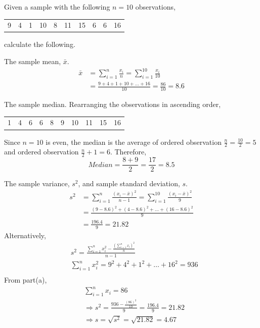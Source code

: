 \begin{example}
Given a sample with the following $n=10$ observations,
\begin{center}
\begin{tabular}{cccccccccc}
9 & 4 & 1 & 10 & 8 & 11 & 15 & 6 & 6 & 16
\end{tabular} 
\end{center}
calculate the following.
\begin{benumerate}
\item The sample mean, $\bar{x}$. 
\begin{align*}
\bar{x} &= \sum_{i=1}^{n} \frac{x_i}{n} = \sum_{i=1}^{10} \frac{x_i}{10}\\
		&= \frac{9 + 4 + 1 + 10 + \hdots + 16}{10} = \frac{86}{10} = 8.6
\end{align*}
\item The sample median.
Rearranging the observations in ascending order,
\begin{center}
\begin{tabular}{cccccccccc}
1 & 4 & 6 & 6 & 8 & 9 & 10 & 11 & 15 & 16
\end{tabular} 
\end{center}
Since $n=10$ is even, the median is the average of ordered observation $\frac{n}{2} = \frac{10}{2} = 5$ and ordered observation $\frac{n}{2} + 1 = 6$. Therefore,
\[Median = \frac{8+9}{2} = \frac{17}{2} = 8.5\]
\item The sample variance, $s^2$, and sample standard deviation, $s$. 
\begin{align*}
s^2 &= \sum_{i=1}^{n} \frac{(x_i - \bar{x})^2}{n-1} = \sum_{i=1}^{10} \frac{(x_i-\bar{x})^2}{9} \\
	& = \frac{(9-8.6)^{2}+(4-8.6)^{2}+\hdots+(16-8.6)^{2}}{9} \\
	&= \frac{196.4}{9} = 21.82
\end{align*}
Alternatively,
\begin{align*}
&s^2 = \frac{\sum_{i=1}^{n} x_i^{2} - \frac{(\sum_{i=1}^{n} x_i)^2}{n}}{n-1} \\
&\sum_{i=1}^{n} x_i^{2} = 9^2 + 4^2 + 1^2 + \hdots + 16^2 = 936 \\
\end{align*}
From part(a),
\begin{align*}
&\sum_{i=1}^{n} x_i = 86 \\
&\Rightarrow s^2 = \frac{936-\frac{(86)^2}{10}}{9} = \frac{196.4}{9} = 21.82 \\
&\Rightarrow s = \sqrt{s^2} = \sqrt{21.82} = 4.67
\end{align*}


\end{benumerate}
\end{example}

